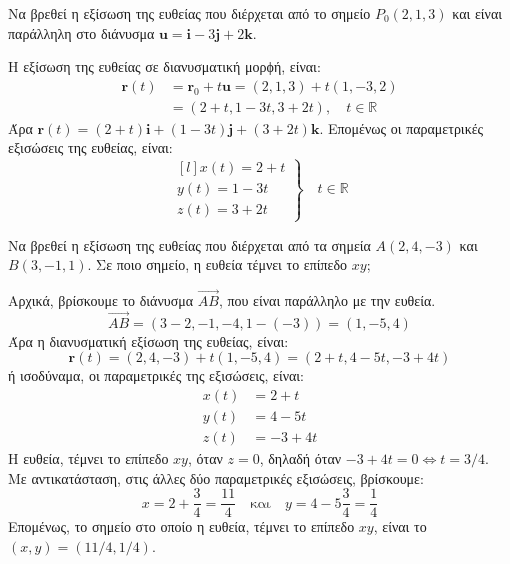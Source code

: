 \begin{example}
  Να βρεθεί η εξίσωση της ευθείας που διέρχεται από το σημείο $ P_{0}(2,1,3) $ 
  και είναι παράλληλη στο διάνυσμα 
  $ \mathbf{u} = \mathbf{i}- 3 \mathbf{j}+2 \mathbf{k} $.
\end{example}
\begin{solution}
  Η εξίσωση της ευθείας σε διανυσματική μορϕή, είναι:
  \begin{align*}
    \mathbf{r}(t) &= \mathbf{r}_{0} + t \mathbf{u} = (2,1,3) + t(1,-3,2) \\
                  &= (2+t,1-3t,3+2t), \quad t \in \mathbb{R}
  \end{align*} 
  Άρα $ \mathbf{r}(t) = (2+t) \mathbf{i} + (1-3t) \mathbf{j} + (3+2t) \mathbf{k} $. 
  Επομένως οι παραμετρικές εξισώσεις της ευθείας, είναι:
  \[
    \left.
      \begin{matrix*}[l]
        x(t) = 2+t \\
        y(t) = 1-3t \\
        z(t) = 3+2t
      \end{matrix*} 
    \right\} \quad  t \in \mathbb{R} 
  \]
\end{solution}

\begin{example}\label{ex:line2}
  Να βρεθεί η εξίσωση της ευθείας που διέρχεται από τα σημεία $ Α(2,4,-3) $ και 
  $ B(3,-1,1) $. Σε ποιο σημείο, η ευθεία τέμνει το επίπεδο $ xy $; 
\end{example}
\begin{solution}
  Αρχικά, βρίσκουμε το διάνυσμα $ \vec{AB} $, που είναι παράλληλο με την ευθεία.
  \[ \vec{AB} = (3-2,-1,-4,1-(-3)) = (1,-5,4) \]
  Άρα η διανυσματική εξίσωση της ευθείας, είναι:
  \[
    \mathbf{r}(t) = (2,4,-3) + t(1,-5,4) = (2+t,4-5t,-3+4t)
  \] 
  ή ισοδύναμα, οι παραμετρικές της εξισώσεις, είναι:
  \begin{align*}
    x(t) &= 2+t \\
    y(t) &= 4-5t \\
    z(t) &= -3+4t
  \end{align*} 
  Η ευθεία, τέμνει το επίπεδο $ xy $, όταν $ z=0 $, δηλαδή όταν $ -3+4t=0
  \Leftrightarrow t = 3/4 $. Με αντικατάσταση, στις άλλες δύο παραμετρικές εξισώσεις, 
  βρίσκουμε:
  \[
    x = 2+ \frac{3}{4} = \frac{11}{4} \quad \text{και} \quad y = 4- 5\frac{3}{4} = 
    \frac{1}{4}  
  \]
  Επομένως, το σημείο στο οποίο η ευθεία, τέμνει το επίπεδο $ xy $, είναι το 
  $ (x,y) = (11/4,1/4) $.
\end{solution}

